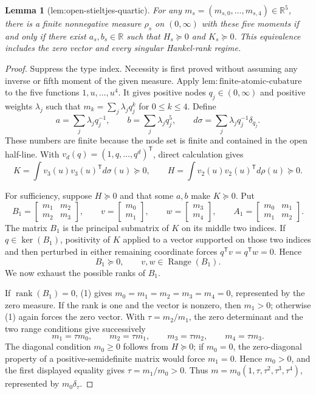 \documentclass{article}
\newtheorem{lemma}{Lemma}
\begin{document}
\begin{lemma}[lem:open-stieltjes-quartic]\label{lem:open-stieltjes-quartic}
For any \(m_s=(m_{s,0},\ldots,m_{s,4})\in\mathbb R^5\), there is a finite nonnegative measure \(\rho_s\) on \((0,\infty)\) with these five moments if and only if there exist \(a_s,b_s\in\mathbb R\) such that \(H_s\succeq0\) and \(K_s\succeq0\). This equivalence includes the zero vector and every singular Hankel-rank regime.
\end{lemma}
\begin{proof}
Suppress the type index.  Necessity is first proved without assuming any
inverse or fifth moment of the given measure.  Apply
\(\mathrm{lem{:}finite\text{-}atomic\text{-}cubature}\) to the five functions
\(1,u,\ldots,u^4\).  It gives positive nodes \(q_j\in(0,\infty)\) and positive
weights \(\lambda_j\) such that
\(m_k=\sum_j\lambda_jq_j^k\) for \(0\le k\le4\).  Define
\[
 a=\sum_j\lambda_jq_j^{-1},\qquad b=\sum_j\lambda_jq_j^5,
 \qquad d\sigma=\sum_j\lambda_jq_j^{-1}\delta_{q_j}.
\]
These numbers are finite because the node set is finite and contained in the
open half-line.  With \(v_d(q)=(1,q,\ldots,q^d)^{\mathsf T}\), direct
calculation gives
\[
 K=\int v_3(u)v_3(u)^{\mathsf T}d\sigma(u)\succeq0,
 \qquad
 H=\int v_2(u)v_2(u)^{\mathsf T}d\rho(u)\succeq0.
\]

For sufficiency, suppose \(H\succeq0\) and that some \(a,b\) make
\(K\succeq0\).  Put
\[
 B_1=\begin{bmatrix}m_1&m_2\\m_2&m_3\end{bmatrix},\qquad
 v=\begin{bmatrix}m_0\\m_1\end{bmatrix},\qquad
 w=\begin{bmatrix}m_3\\m_4\end{bmatrix},\qquad
 A_1=\begin{bmatrix}m_0&m_1\\m_1&m_2\end{bmatrix}.
\]
The matrix \(B_1\) is the principal submatrix of \(K\) on its middle two
indices.  If \(q\in\ker(B_1)\), positivity of \(K\) applied to a vector
supported on those two indices and then perturbed in either remaining
coordinate forces \(q^{\mathsf T}v=q^{\mathsf T}w=0\).  Hence
\[
 B_1\succeq0,\qquad v,w\in\operatorname{Range}(B_1). \tag{1}
\]
We now exhaust the possible ranks of \(B_1\).

If \(\operatorname{rank}(B_1)=0\), (1) gives
\(m_0=m_1=m_2=m_3=m_4=0\), represented by the zero measure.  If the rank is
one and the vector is nonzero, then \(m_1>0\); otherwise (1) again forces the
zero vector.  With \(\tau=m_2/m_1\), the zero determinant and the two range
conditions give successively
\[
 m_1=\tau m_0,\qquad m_2=\tau m_1,\qquad
 m_3=\tau m_2,\qquad m_4=\tau m_3.
\]
The diagonal condition \(m_0\ge0\) follows from \(H\succeq0\); if \(m_0=0\),
the zero-diagonal property of a positive-semidefinite matrix would force
\(m_1=0\).  Hence \(m_0>0\), and the first displayed equality gives
\(\tau=m_1/m_0>0\).  Thus
\(m=m_0(1,\tau,\tau^2,\tau^3,\tau^4)\), represented by
\(m_0\delta_\tau\).


\end{proof}
\end{document}
